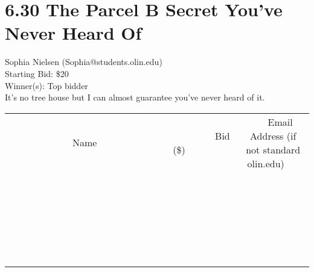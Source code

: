 \documentclass[11pt]{article}
\begin{document}
\section*{6.30 The Parcel B Secret You've Never Heard Of}
Sophia Nielsen (Sophia@students.olin.edu) \\
Starting Bid: \$20 \\
Winner(s): 
Top bidder \\
It's no tree house but I can almost guarantee you've never heard of it. \\[6ex]
\begin{tabular}{c c c}
~~~~~~~~~~~~~Name~~~~~~~~~~~~~ & ~~~~~~~~~Bid (\$)~~~~~~~~~ & ~~~Email Address (if not standard olin.edu)~~~ \\
 & & \\
\hline
 & & \\
\hline
 & & \\
\hline
 & & \\
\hline
 & & \\
\hline
 & & \\
\hline
 & & \\
\hline
 & & \\
\hline
 & & \\
\hline
 & & \\
\hline
 & & \\
\hline
 & & \\
\hline
 & & \\
\hline
 & & \\
\hline
 & & \\
\hline
 & & \\
\hline
 & & \\
\hline
 & & \\
\hline
 & & \\
\hline
 & & \\
\hline
 & & \\
\hline
 & & \\
\hline
 & & \\
\hline
 & & \\
\hline
 & & \\
\hline
 & & \\
\hline
\end{tabular}
\clearpage
\end{document}
